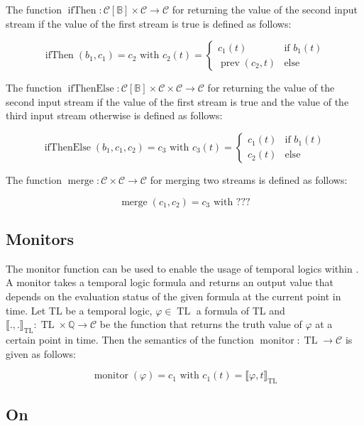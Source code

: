 The function $\operatorname{ifThen}: \mathcal{C}[\mathbb{B}] \times \mathcal{C} \rightarrow \mathcal{C}$ for returning the value of the second input stream if the value of the first stream is true is defined as follows:

\[\operatorname{ifThen}(b_1,c_1) = c_2 \text{ with } c_2(t) = \begin{cases}
c_1(t) & \text{if } b_1(t) \\
\operatorname{prev}(c_2,t) & \text{else}
\end{cases}\]

The function $\operatorname{ifThenElse}: \mathcal{C}[\mathbb{B}] \times \mathcal{C} \times \mathcal{C} \rightarrow \mathcal{C}$ for returning the value of the second input stream if the value of the first stream is true and the value of the third input stream otherwise is defined as follows:

\[\operatorname{ifThenElse}(b_1,c_1,c_2) = c_3 \text{ with } c_3(t) = \begin{cases}
c_1(t) & \text{if } b_1(t) \\
c_2(t) & \text{else}
\end{cases}\]

The function $\operatorname{merge}: \mathcal{C} \times \mathcal{C} \rightarrow \mathcal{C}$ for merging two streams is defined as follows:

\[\operatorname{merge}(c_1,c_2) = c_3 \text{ with } ???\]

\subsection{Monitors}

The monitor function can be used to enable the usage of temporal logics within \tessla. A monitor takes a temporal logic formula and returns an output value that depends on the evaluation status of the given formula at the current point in time. Let TL be a temporal logic, $\varphi \in \operatorname{TL}$ a formula of TL and $\llbracket . , . \rrbracket_{\operatorname{TL}}: \operatorname{TL} \times \mathbb{Q} \rightarrow \mathcal{C}$ be the function that returns the truth value of $\varphi$ at a certain point in time. Then the semantics of the function $\operatorname{monitor}: \operatorname{TL} \rightarrow \mathcal{C}$ is given as follows:

\[\operatorname{monitor}(\varphi) = c_1 \text{ with } c_1(t) = \llbracket \varphi, t \rrbracket_{\operatorname{TL}}\]

\subsection{On}
